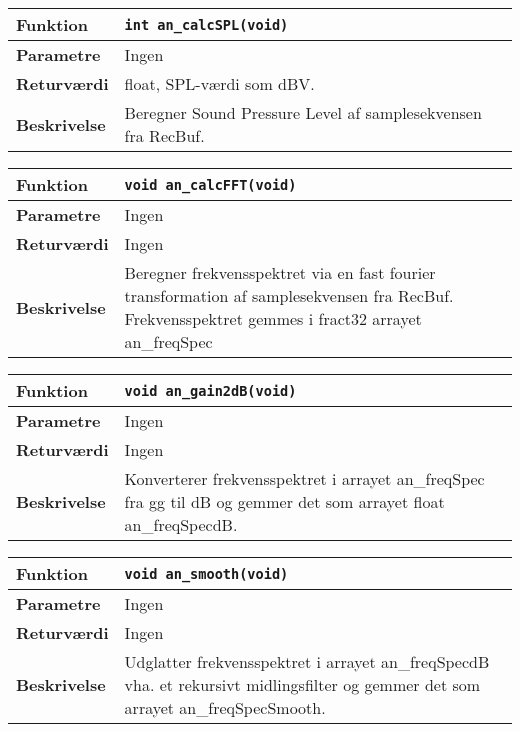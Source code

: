 \begin{center}
    \begin{tabular}{ | l | p{} |}
    \hline
    \textbf{Funktion}	& \verb+int an_calcSPL(void) +						\\ \hline
    \textbf{Parametre} 	& Ingen		\\ \hline
    \textbf{Returværdi}	& float, SPL-værdi som dBV.							\\ \hline
    \textbf{Beskrivelse}& Beregner Sound Pressure Level af samplesekvensen fra RecBuf. \\ \hline
    \end{tabular}
\end{center} 

\begin{center}
    \begin{tabular}{ | l | p{} |}
    \hline
    \textbf{Funktion}	& \verb+void an_calcFFT(void) +						\\ \hline
    \textbf{Parametre} 	& Ingen		\\ \hline
    \textbf{Returværdi}	& Ingen							\\ \hline
    \textbf{Beskrivelse}& Beregner frekvensspektret via en fast fourier transformation af samplesekvensen fra RecBuf. Frekvensspektret gemmes i fract32 arrayet an\_freqSpec\\ \hline
    \end{tabular}
\end{center}

\begin{center}
    \begin{tabular}{ | l | p{} |}
    \hline
    \textbf{Funktion}	& \verb+void an_gain2dB(void) +						\\ \hline
    \textbf{Parametre} 	& Ingen		\\ \hline
    \textbf{Returværdi}	& Ingen							\\ \hline
    \textbf{Beskrivelse}& Konverterer frekvensspektret i arrayet an\_freqSpec fra gg til dB og gemmer det som arrayet float an\_freqSpecdB. \\ \hline
    \end{tabular}
\end{center}  

\begin{center}
    \begin{tabular}{ | l | p{} |}
    \hline
    \textbf{Funktion}	& \verb+void an_smooth(void) +						\\ \hline
    \textbf{Parametre} 	& Ingen		\\ \hline
    \textbf{Returværdi}	& Ingen							\\ \hline
    \textbf{Beskrivelse}& Udglatter frekvensspektret i arrayet an\_freqSpecdB vha. et rekursivt midlingsfilter og gemmer det som arrayet an\_freqSpecSmooth.  \\ \hline
    \end{tabular}
\end{center}

